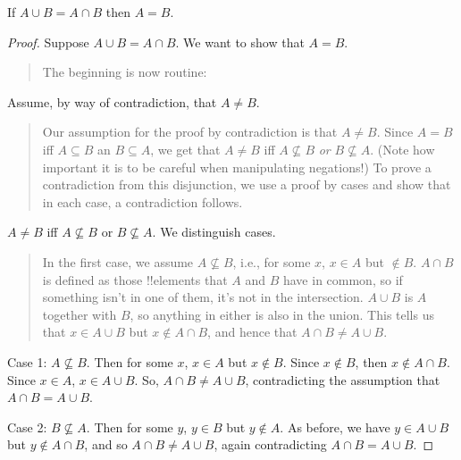 \documentclass[../../../include/open-logic-section]{subfiles}
\begin{document}
\begin{prop}
If $A \cup B = A \cap B$ then $A = B$.
\end{prop}

\begin{proof}
  Suppose $A \cup B = A \cap B$. We want to show that $A = B$.
  \begin{quote}
    The beginning is now routine:
  \end{quote}
  Assume, by way of contradiction, that $A \neq B$.
  \begin{quote}
    Our assumption for the proof by contradiction is that $A \neq
    B$. Since $A = B$ iff $A \subseteq B$ an $B \subseteq A$, we get
    that $A \neq B$ iff $A \nsubseteq B$ \emph{or} $B \nsubseteq
    A$. (Note how important it is to be careful when manipulating
    negations!{}) To prove a contradiction from this disjunction, we
    use a proof by cases and show that in each case, a contradiction
    follows.
  \end{quote}
  $A \neq B$ iff $A \nsubseteq B$ or $B \nsubseteq A$. We distinguish
  cases.
  \begin{quote}
    In the first case, we assume $A \nsubseteq B$, i.e., for some $x$,
    $x \in A$ but $\notin B$. $A \cap B$ is defined as those
    !!{element}s that $A$ and $B$ have in common, so if something
    isn't in one of them, it's not in the intersection. $A \cup B$ is
    $A$ together with $B$, so anything in either is also in the
    union. This tells us that $x \in A \cup B$ but $x \notin A \cap
    B$, and hence that $A \cap B \neq A \cup B$.
  \end{quote}
  
  Case 1: $A \nsubseteq B$. Then for some $x$, $x \in A$ but $x \notin
  B$. Since $x \notin B$, then $x \notin A \cap B$. Since $x \in A$,
  $x \in A \cup B$. So, $A \cap B \neq A \cup B$, contradicting the
  assumption that $A \cap B = A \cup B$.

  Case 2: $B \nsubseteq A$. Then for some $y$, $y \in B$ but $y \notin
  A$. As before, we have $y \in A \cup B$ but $y \notin A \cap B$, and
  so $A \cap B \neq A \cup B$, again contradicting $A \cap B = A \cup
  B$. 
\end{proof}
\end{document}
